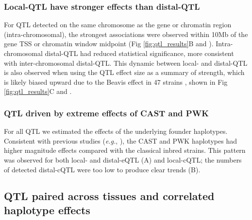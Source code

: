 \documentclass[10pt,letterpaper]{article}
\newcommand{\eg}{\emph{e.g.}\xspace}
\begin{document}
\subsubsection*{Local-QTL have stronger effects than distal-QTL}
For QTL detected on the same chromosome as the gene or chromatin region (intra-chromosomal), the strongest associations were observed within 10Mb of the gene TSS or chromatin window midpoint (Fig \ref{fig:qtl_results}B and ). Intra-chromosomal distal-QTL had reduced statistical significance, more consistent with inter-chromosomal distal-QTL. This dynamic between local- and distal-QTL is also observed when using the QTL effect size as a summary of strength, which is likely biased upward due to the Beavis effect in 47 strains \cite{Keele2019}, shown in Fig \ref{fig:qtl_results}C and .

\subsubsection*{QTL driven by extreme effects of CAST and PWK}
For all QTL we estimated the effects of the underlying founder haplotypes. Consistent with previous studies (\eg, \cite{Aylor2011}), the CAST and PWK haplotypes had higher magnitude effects compared with the classical inbred strains. This pattern was observed for both local- and distal-eQTL (A) and local-cQTL; the numbers of detected distal-cQTL were too low to produce clear trends (B).

\subsection*{QTL paired across tissues and correlated haplotype effects}
\end{document}
